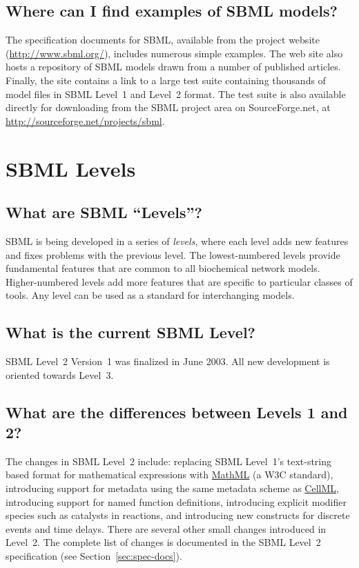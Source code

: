 \documentclass{sbmlfaq}
\begin{document}
\subsection{Where can I find examples of SBML models?}

The specification documents for SBML, available from the project website
(\url{http://www.sbml.org/}), includes numerous simple examples.  The web
site also hosts a repository of SBML models drawn from a number of
published articles.  Finally, the site contains a link to a large test
suite containing thousands of model files in SBML Level~1 and Level~2
format.  The test suite is also available directly for downloading from the
SBML project area on SourceForge.net, at
\url{http://sourceforge.net/projects/sbml}.


\section{SBML Levels}
\label{sec:sbml-levels}

\subsection{What are SBML ``Levels''?}

SBML is being developed in a series of \emph{levels}, where each level adds
new features and fixes problems with the previous level.  The
lowest-numbered levels provide fundamental features that are common to all
biochemical network models.  Higher-numbered levels add more features that
are specific to particular classes of tools.  Any level can be used as a
standard for interchanging models.

\subsection{What is the current SBML Level?}

SBML Level~2 Version~1 was finalized in June 2003.  All new development is
oriented towards Level~3.


\subsection{What are the differences between Levels 1 and 2?}

The changes in SBML Level~2 include: replacing SBML Level~1's text-string
based format for mathematical expressions with
\href{http://www.w3.org/TR/2003/WD-MathML2-20030411/}{MathML} (a W3C
standard), introducing support for metadata using the same metadata scheme
as \href{http://www.cellml.org}{CellML}, introducing support for named
function definitions, introducing explicit modifier species such as
catalysts in reactions, and introducing new constructs for discrete events
and time delays.  There are several other small changes introduced in
Level~2.  The complete list of changes is documented in the SBML Level~2
specification (see Section~\ref{sec:spec-docs}).
\end{document}
